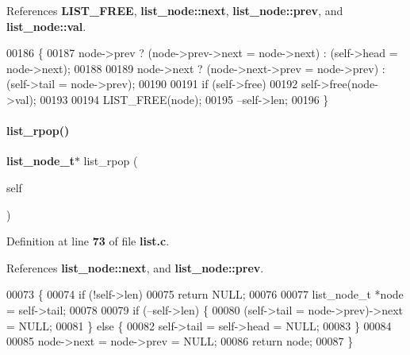 References \textbf{ L\+I\+S\+T\+\_\+\+F\+R\+EE}, \textbf{ list\+\_\+node\+::next}, \textbf{ list\+\_\+node\+::prev}, and \textbf{ list\+\_\+node\+::val}.


\begin{DoxyCode}
00186                                                   \{
00187   node->prev ? (node->prev->next = node->next) : (self->head = node->next);
00188 
00189   node->next ? (node->next->prev = node->prev) : (self->tail = node->prev);
00190 
00191   \textcolor{keywordflow}{if} (self->free)
00192     \textcolor{keyword}{self}->free(node->val);
00193 
00194   LIST_FREE(node);
00195   --\textcolor{keyword}{self}->len;
00196 \}
\end{DoxyCode}
\mbox{\label{a00029_a53460b319b561ce2201bbf95450f1af7}} 
\paragraph{list\+\_\+rpop()}
{\footnotesize\ttfamily \textbf{ list\+\_\+node\+\_\+t}$\ast$ list\+\_\+rpop (\begin{DoxyParamCaption}\item[{\textbf{ list\+\_\+t} $\ast$}]{self }\end{DoxyParamCaption})}



Definition at line \textbf{ 73} of file \textbf{ list.\+c}.



References \textbf{ list\+\_\+node\+::next}, and \textbf{ list\+\_\+node\+::prev}.


\begin{DoxyCode}
00073                                      \{
00074   \textcolor{keywordflow}{if} (!self->len)
00075     \textcolor{keywordflow}{return} NULL;
00076 
00077   list_node_t *node = \textcolor{keyword}{self}->tail;
00078 
00079   \textcolor{keywordflow}{if} (--self->len) \{
00080     (\textcolor{keyword}{self}->tail = node->prev)->next = NULL;
00081   \} \textcolor{keywordflow}{else} \{
00082     \textcolor{keyword}{self}->tail = \textcolor{keyword}{self}->head = NULL;
00083   \}
00084 
00085   node->next = node->prev = NULL;
00086   \textcolor{keywordflow}{return} node;
00087 \}
\end{DoxyCode}
\mbox{\label{a00029_a4edfa9b7742154bff4fc2cb05d044af9}} 
